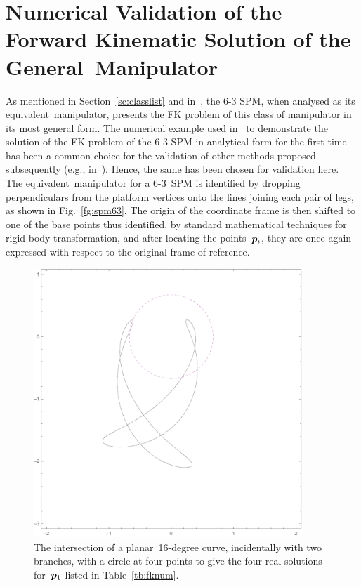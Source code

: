 \documentclass[DD]{iitmdiss}
\newcommand{\mref}[1]{\ref{#1}}
\newcommand{\mcite}[1]{\cite{#1}}
\newcommand{\mlabel}[1]{\label{#1}}
\begin{document}
\section{Numerical Validation of the Forward Kinematic Solution of the General~\rps Manipulator}\mlabel{sc:numver}
%
As mentioned in Section~\mref{sc:classlist} and in~\mcite{innocenti1990}, the 6-3 SPM, when analysed as its equivalent~\rps manipulator, presents the FK problem of this class of manipulator in its most general form. The numerical example used in~\mcite{innocenti1990} to demonstrate the solution of the FK problem of the 6-3 SPM in analytical form for the first time has been a common choice for the validation of other methods proposed subsequently (e.g., in~\mcite{kong2018}). Hence, the same has been chosen for validation here. \\
The equivalent~\rps manipulator for a 6-3~SPM is identified by dropping perpendiculars from the platform vertices onto the lines joining each pair of legs, as shown in Fig.~\mref{fg:spm63}. The origin of the coordinate frame is then shifted to one of the base points thus identified, by standard mathematical techniques for rigid body transformation, and after locating the points~$\bm{p}_i$, they are once again expressed with respect to the original frame of reference. \\
%
\begin{figure}[h]
	\centering
	\includegraphics[width=0.9\textwidth]{spmcurves_placeholder.pdf}
	\caption{The intersection of a planar~16-degree curve, incidentally with two branches, with a circle at four points to give the four real solutions for~$\bm{p}_1$ listed in Table~\mref{tb:fknum}.}
	\mlabel{fg:spmcurves}
\end{figure}
\end{document}
